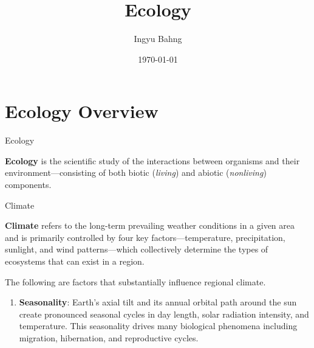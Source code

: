 \documentclass[10pt]{article}
\title{Ecology}
\date{\today}
\author{Ingyu Bahng}
\begin{document}


\section{Ecology Overview}

  \begin{core}{Ecology}

    \textbf{Ecology} is the scientific study of the interactions between organisms and their environment---consisting of both biotic (\textit{living}) and abiotic (\textit{nonliving}) components.

  \end{core}

  \begin{core}{Climate}

    \textbf{Climate} refers to the long-term prevailing weather conditions in a given area and is primarily controlled by four key factors---temperature, precipitation, sunlight, and wind patterns---which collectively determine the types of ecosystems that can exist in a region.

    The following are factors that substantially influence regional climate.

    \begin{enumerate}

      \item \textbf{Seasonality}: Earth's axial tilt and its annual orbital path around the sun create pronounced seasonal cycles in day length, solar radiation intensity, and temperature. This seasonality drives many biological phenomena including migration, hibernation, and reproductive cycles.



    \end{enumerate}

  \end{core}
\end{document}
